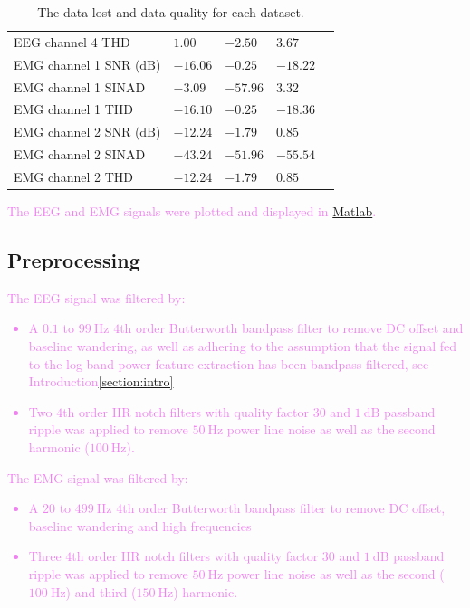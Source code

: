 \begin{table}[ht]
\begin{tabular}{|l|l|l|l|l|}
            EEG channel 4 THD                     & $1.00$            & $-2.50$           & $3.67$                    \\
            EMG channel 1 SNR ($\text{dB}$)       & $-16.06$          & $-0.25$           & $-18.22$                  \\
            EMG channel 1 SINAD                   & $-3.09$           & $-57.96$          & $3.32$                    \\
            EMG channel 1 THD                     & $-16.10$          & $-0.25$           & $-18.36$                  \\
            EMG channel 2 SNR ($\text{dB}$)       & $-12.24$          & $-1.79$           & $0.85$                    \\
            EMG channel 2 SINAD                   & $-43.24$          & $-51.96$          & $-55.54$                  \\ 
            EMG channel 2 THD                     & $-12.24$          & $-1.79$           & $0.85$                    \\
			\hline
		\end{tabular}
	\caption{The data lost and data quality for each dataset.}
	\label{tab:lost_quality}
\end{table}

\textcolor{violet}{The EEG and EMG signals were plotted and displayed in \href{https://se.mathworks.com/products/matlab.html}{Matlab}.}


\subsection{Preprocessing}
\textcolor{violet}{The EEG signal was filtered by:
	\begin{itemize}
		\item A $0.1$ to $99\:\text{Hz}$ $4$th order Butterworth bandpass filter to remove DC offset and baseline wandering, as well as adhering to the assumption that the signal fed to the log band power feature extraction has been bandpass filtered, see Introduction\:\ref{section:intro}
		\item Two $4$th order IIR notch filters with quality factor $30$ and $1\:\text{dB}$ passband ripple was applied to remove $50\:\text{Hz}$ power line noise as well as the second harmonic ($100\:\text{Hz}$).
	\end{itemize}}
\textcolor{violet}{The EMG signal was filtered by:
	\begin{itemize}
		\item A $20$ to $499\:\text{Hz}$ $4$th order Butterworth bandpass filter to remove DC offset, baseline wandering and high frequencies
		\item Three $4$th order IIR notch filters with quality factor $30$ and $1\:\text{dB}$ passband ripple was applied to remove $50\:\text{Hz}$ power line noise as well as the second ($100\:\text{Hz}$) and third ($150\:\text{Hz}$) harmonic.
	\end{itemize}}

